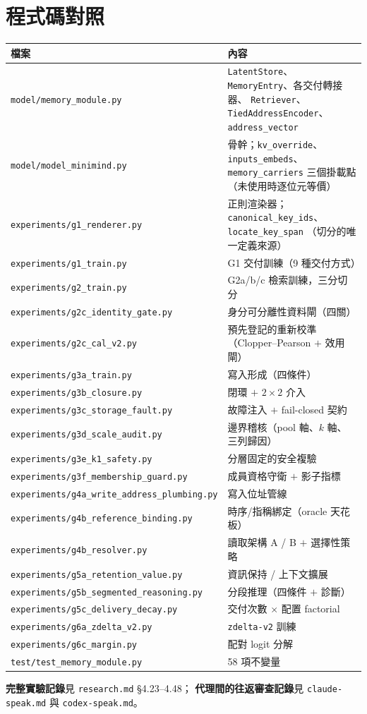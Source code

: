 \documentclass[11pt, a4paper]{article}
\begin{document}
\appendix
\section{程式碼對照}

\begin{longtable}{p{} p{}}
\toprule
檔案 & 內容 \\
\midrule
\endhead
\verb|model/memory_module.py| & \verb|LatentStore|、\verb|MemoryEntry|、各交付轉接器、
\verb|Retriever|、\verb|TiedAddressEncoder|、\verb|address_vector| \\
\verb|model/model_minimind.py| & 骨幹；\verb|kv_override|、\verb|inputs_embeds|、
\verb|memory_carriers| 三個掛載點（未使用時逐位元等價） \\
\verb|experiments/g1_renderer.py| & 正則渲染器；\verb|canonical_key_ids|、\verb|locate_key_span|
（切分的唯一定義來源）\\
\verb|experiments/g1_train.py| & G1 交付訓練（9 種交付方式）\\
\verb|experiments/g2_train.py| & G2a/b/c 檢索訓練，三分切分 \\
\verb|experiments/g2c_identity_gate.py| & 身分可分離性資料閘（四關）\\
\verb|experiments/g2c_cal_v2.py| & 預先登記的重新校準（Clopper--Pearson $+$ 效用閘）\\
\verb|experiments/g3a_train.py| & 寫入形成（四條件）\\
\verb|experiments/g3b_closure.py| & 閉環 $+$ $2\times2$ 介入 \\
\verb|experiments/g3c_storage_fault.py| & 故障注入 $+$ fail-closed 契約 \\
\verb|experiments/g3d_scale_audit.py| & 邊界稽核（pool 軸、$k$ 軸、三列歸因）\\
\verb|experiments/g3e_k1_safety.py| & 分層固定的安全複驗 \\
\verb|experiments/g3f_membership_guard.py| & 成員資格守衛 $+$ 影子指標 \\
\verb|experiments/g4a_write_address_plumbing.py| & 寫入位址管線 \\
\verb|experiments/g4b_reference_binding.py| & 時序/指稱綁定（oracle 天花板）\\
\verb|experiments/g4b_resolver.py| & 讀取架構 A / B $+$ 選擇性策略 \\
\verb|experiments/g5a_retention_value.py| & 資訊保持 / 上下文擴展 \\
\verb|experiments/g5b_segmented_reasoning.py| & 分段推理（四條件 $+$ 診斷）\\
\verb|experiments/g5c_delivery_decay.py| & 交付次數 $\times$ 配置 factorial \\
\verb|experiments/g6a_zdelta_v2.py| & \verb|zdelta-v2| 訓練 \\
\verb|experiments/g6c_margin.py| & 配對 logit 分解 \\
\verb|test/test_memory_module.py| & 58 項不變量 \\
\bottomrule
\end{longtable}

\vspace{1em}
\noindent
\textbf{完整實驗記錄}見 \verb|research.md| §4.23--4.48；
\textbf{代理間的往返審查記錄}見 \verb|claude-speak.md| 與 \verb|codex-speak.md|。
\end{document}
